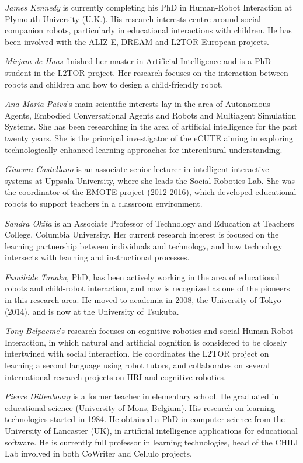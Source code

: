\documentclass{sig-alternate-05-2015}
\begin{document}
\emph{James Kennedy} is currently completing his PhD in Human-Robot Interaction at Plymouth University (U.K.). His research interests centre around social companion robots, particularly in educational interactions with children. He has been involved with the ALIZ-E, DREAM and L2TOR European projects.

\emph{Mirjam de Haas} finished her master in Artificial Intelligence and is a PhD student in the L2TOR project. Her research focuses on the interaction between robots and children and how to design a child-friendly robot.

\emph{Ana Maria Paiva}'s main scientific interests lay in the area of Autonomous Agents, Embodied Conversational Agents and Robots and Multiagent Simulation Systems. She has been researching in the area of artificial intelligence for the past twenty years. She is the principal investigator of the eCUTE aiming in exploring technologically-enhanced learning approaches for intercultural understanding.

\emph{Ginevra Castellano} is an associate senior lecturer in intelligent interactive systems at Uppsala University, where she leads the Social Robotics Lab. She was the coordinator of the EMOTE project (2012-2016), which developed educational robots to support teachers in a classroom environment.

\emph{Sandra Okita} is an Associate Professor of Technology and Education at Teachers College, Columbia University. Her current research interest is focused on the learning partnership between individuals and technology, and how technology intersects with learning and instructional processes.

\emph{Fumihide Tanaka}, PhD,  has been actively working in the area of educational robots and child-robot interaction, and now is recognized as one of the pioneers in this research area. He moved to academia in 2008, the University of Tokyo (2014), and is now at the University of Tsukuba.

\emph{Tony Belpaeme}'s research focuses on cognitive robotics and social Human-Robot Interaction, in which natural and artificial cognition is considered to be closely intertwined with social interaction. He coordinates the L2TOR project on learning a second language using robot tutors, and collaborates on several international research projects on HRI and cognitive robotics.

\emph{Pierre Dillenbourg} is a former teacher in elementary school. He graduated in educational science (University of Mons, Belgium). His research on learning technologies started in 1984. He obtained a PhD in computer science from the University of Lancaster (UK), in artificial intelligence applications for educational software. He is currently full professor in learning technologies, head of the CHILI Lab involved in both CoWriter and Cellulo projects.
\end{document}
